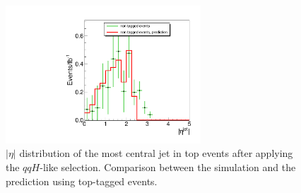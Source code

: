 \begin{figure}[!htbp]
\begin{center}
\includegraphics[width=0.65\textwidth]{figures/vbf_btagprediction_jetmin.pdf}
\caption{$|\eta|$ distribution of the most central jet in top events after 
applying the $qqH$-like selection. Comparison between the simulation and 
the prediction using top-tagged events.}
\label{fig:vbf_btagprediction_jetmin}
\end{center}
\end{figure}




